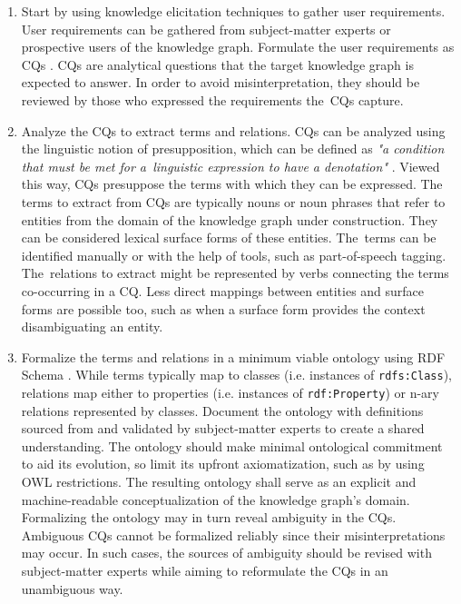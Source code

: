 \documentclass[
]{ceurart}
\begin{document}
\begin{enumerate}
    \item Start by using knowledge elicitation techniques \cite{Shadbolt2015} to gather user requirements. User requirements can be gathered from subject-matter experts or prospective users of the knowledge graph. Formulate the user requirements as CQs \cite{Gruninger1994}. CQs are analytical questions that the target knowledge graph is expected to answer. In order to avoid misinterpretation, they should be reviewed by those who expressed the requirements the~CQs capture.
    \item Analyze the CQs to extract terms and relations. CQs can be analyzed using the linguistic notion of presupposition, which can be defined as \textit{"a condition that must be met for a~linguistic expression to have a denotation"} \cite{Ren2014}. Viewed this way, CQs presuppose the terms with which they can be expressed. The terms to extract from CQs are typically nouns or noun phrases that refer to entities from the domain of the knowledge graph under construction. They can be considered lexical surface forms of these entities. The~terms can be identified manually or with the help of tools, such as part-of-speech tagging. The~relations to extract might be represented by verbs connecting the terms co-occurring in a CQ. Less direct mappings between entities and surface forms are possible too, such as when a surface form provides the context disambiguating an entity.
    \item Formalize the terms and relations in a minimum viable ontology using RDF Schema \cite{Brickley2014}. While terms typically map to classes (i.e. instances of \texttt{rdfs:Class}), relations map either to properties (i.e. instances of \texttt{rdf:Property}) or n-ary relations represented by classes. Document the ontology with definitions sourced from and validated by subject-matter experts to create a shared understanding. The ontology should make minimal ontological commitment to aid its evolution, so limit its upfront axiomatization, such as by using OWL restrictions. The resulting ontology shall serve as an explicit and machine-readable conceptualization of the knowledge graph's domain. Formalizing the ontology may in turn reveal ambiguity in the CQs. Ambiguous CQs cannot be formalized reliably since their misinterpretations may occur. In such cases, the sources of ambiguity should be revised with subject-matter experts while aiming to reformulate the CQs in an unambiguous way.

\end{enumerate}
\end{document}
